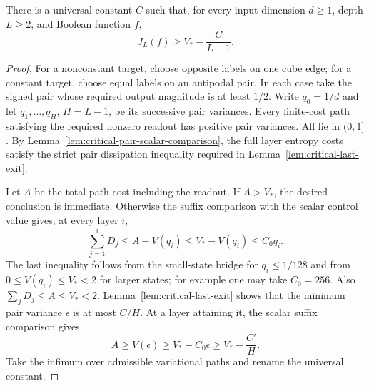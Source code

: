 \begin{theorem}
\label{thm:critical-sharp-lower}
There is a universal constant $C$ such that, for every input dimension
$d\ge1$, depth $L\ge2$, and Boolean function $f$,
\[
 J_L(f)\ge V_*-\frac{C}{L-1}.
\]
\end{theorem}

\begin{proof}
For a nonconstant target, choose opposite labels on one cube edge;
for a constant target, choose equal labels on an antipodal pair. In
each case take the signed pair whose required output magnitude is at
least $1/2$. Write $q_0=1/d$ and let
$q_1,\ldots,q_H$, $H=L-1$, be its successive pair variances.
Every finite-cost path satisfying the required nonzero readout has
positive pair variances. All lie in $(0,1]$.
By Lemma~\ref{lem:critical-pair-scalar-comparison}, the full layer
entropy costs satisfy the strict pair dissipation inequality required
in Lemma~\ref{lem:critical-last-exit}.

Let $A$ be the total path cost including the readout. If $A>V_*$,
the desired conclusion is immediate. Otherwise the suffix comparison
with the scalar control value gives, at every layer $i$,
\[
 \sum_{j=1}^{i}D_j\le A-V(q_i)
 \le V_*-V(q_i)\le C_0q_i.
\]
The last inequality follows from the small-state bridge for
$q_i\le1/128$ and from $0\le V(q_i)\le V_*<2$ for larger states;
for example one may take $C_0=256$. Also
$\sum_jD_j\le A\le V_*<2$.
Lemma~\ref{lem:critical-last-exit} shows that the minimum pair variance
$\epsilon$ is at most $C/H$. At a layer attaining it, the scalar
suffix comparison gives
\[
 A\ge V(\epsilon)\ge V_*-C_0\epsilon\ge V_*-\frac{C'}H.
\]
Take the infimum over admissible variational paths and rename the
universal constant.
\end{proof}

